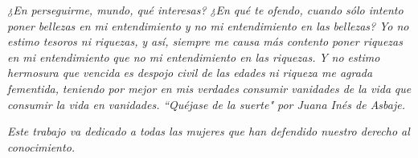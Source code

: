   
\newpage


\begin{flushleft}
\textit{¿En perseguirme, mundo, qué interesas?}\newline
\textit{¿En qué te ofendo, cuando sólo intento}\newline
\textit{poner bellezas en mi entendimiento}\newline
\textit{y no mi entendimiento en las bellezas?}\newline
\textit{Yo no estimo tesoros ni riquezas,}\newline
\textit{y así, siempre me causa más contento}\newline
\textit{poner riquezas en mi entendimiento}\newline
\textit{que no mi entendimiento en las riquezas.}\newline
\textit{Y no estimo hermosura que vencida}\newline
\textit{es despojo civil de las edades}\newline
\textit{ni riqueza me agrada fementida,}\newline
\textit{teniendo por mejor en mis verdades}\newline
\textit{consumir vanidades de la vida}\newline
\textit{que consumir la vida en vanidades.}\newline
\textit{``Quéjase de la suerte" por Juana Inés de Asbaje.}\newline

\textit{Este trabajo va dedicado a todas las mujeres que han defendido nuestro derecho al conocimiento.}
\end{flushleft}



\clearpage